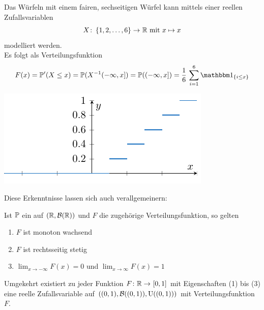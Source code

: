 \begin{beispiel}
    Das Würfeln mit einem fairen, sechseitigen Würfel kann mittels einer reellen Zufallsvariablen
    \begin{equation*}
        \abb{X}{\menge{1,2,\dots, 6}}{\R} \mit x \mapsto x
    \end{equation*}
    modelliert werden. \\
    Es folgt als Verteilungsfunktion
    \begin{equation*}
	    F(x) 
	    = \P'(X \leq x) = \P(X^{-1}(-\infty,x]) = \P((-\infty,x])
	    = \frac{1}{6} \, \sum_{i=1}^{6} \one_{\menge{i \leq x}}
    \end{equation*}
\end{beispiel}

\begin{center}
    \includegraphics{./stoch_abbildungen/wuerfel_verteilungsfunktion.pdf}
\end{center}

Diese Erkenntnisse lassen sich auch verallgemeinern:

\begin{satz}
    Ist $\P$ ein \WMass auf $(\R, \borel\R)$ und $F$ die zugehörige Verteilungsfunktion, so gelten
    \begin{enumerate}[nolistsep, topsep=-\parskip]
        \item $F$ ist monoton wachsend
        \item $F$ ist rechtsseitig stetig
        \item $\lim_{x\to -\infty} F(x) = 0$ und $\lim_{x\to \infty} F(x) = 1$
    \end{enumerate}
    Umgekehrt existiert zu jeder Funktion $\abb{F}{\R}{[0,1]}$ mit Eigenschaften (1) bis (3) eine reelle Zufallsvariable auf $((0,1), \borel{(0,1)}, \Uni((0,1)))$ mit Verteilungsfunktion $F$.
\end{satz}

